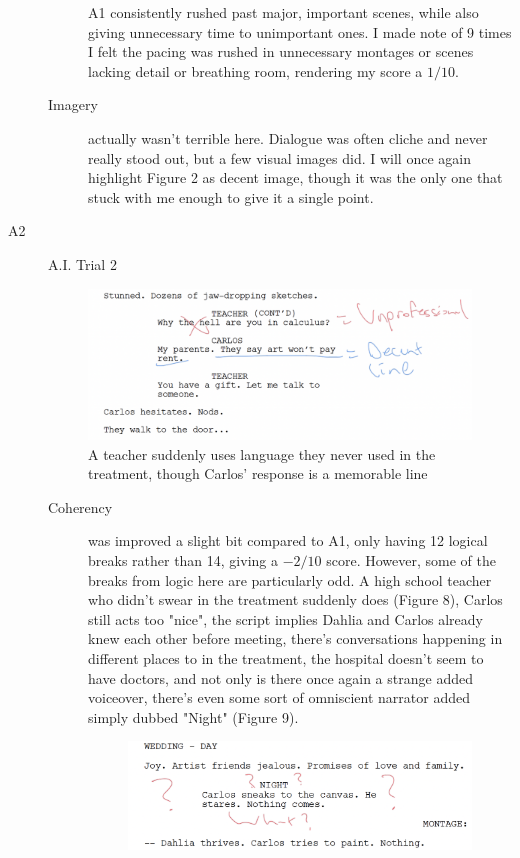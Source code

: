 \documentclass[sigconf]{acmart}
\begin{document}
\begin{description}
\begin{description}
        A1 consistently rushed past major, important scenes, while also giving unnecessary time to unimportant ones. I made note of 9 times I felt the pacing was rushed in unnecessary montages or scenes lacking detail or breathing room, rendering my score a $1/10$.
        \item[Imagery] actually wasn't terrible here. Dialogue was often cliche and never really stood out, but a few visual images did. I will once again highlight Figure 2 as decent image, though it was the only one that stuck with me enough to give it a single point.
    \end{description}
    \item[A2] A.I. Trial 2
    \begin{figure}[!hbt]
            \centering
            \includegraphics[width=0.8\linewidth]{images/TeacherSwearing.png}
            \caption{A teacher suddenly uses language they never used in the treatment, though Carlos' response is a memorable line}
            \label{fig:a2-teacher}
        \end{figure}
    \begin{description}
        \item[Coherency] was improved a slight bit compared to A1, only having 12 logical breaks rather than 14, giving a $-2/10$ score. However, some of the breaks from logic here are particularly odd. A high school teacher who didn't swear in the treatment suddenly does (Figure 8), Carlos still acts too "nice", the script implies Dahlia and Carlos already knew each other before meeting, there's conversations happening in different places to in the treatment, the hospital doesn't seem to have doctors, and not only is there once again a strange added voiceover, there's even some sort of omniscient narrator added simply dubbed "Night" (Figure 9).
        \begin{figure}[!hbt]
            \centering
            \includegraphics[width=0.8\linewidth]{images/NightNarrator.png}

\end{figure}
\end{description}
\end{description}
\end{document}

